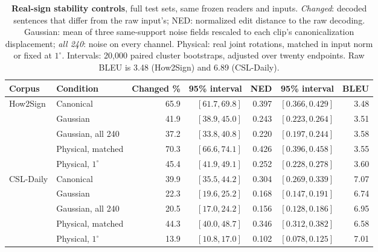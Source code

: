 \begin{table}[!htbp]
\centering\footnotesize
\caption{\textbf{Real-sign stability controls}, full test sets, same frozen readers and inputs. \emph{Changed}: decoded sentences that differ from the raw input's; NED: normalized edit distance to the raw decoding. Gaussian: mean of three same-support noise fields rescaled to each clip's canonicalization displacement; \emph{all 240}: noise on every channel. Physical: real joint rotations, matched in input norm or fixed at $1^\circ$. Intervals: 20,000 paired cluster bootstraps, adjusted over twenty endpoints. Raw BLEU is 3.48 (How2Sign) and 6.89 (CSL-Daily).}\label{tab:signstability}
\begin{tabular}{@{}llrrrrr@{}}\toprule
Corpus&Condition&Changed \%&95\% interval&NED&95\% interval&BLEU\\\midrule
How2Sign&Canonical&65.9&$[61.7,69.8]$&0.397&$[0.366,0.429]$&3.48\\
&Gaussian&41.9&$[38.9,45.0]$&0.243&$[0.223,0.264]$&3.51\\
&Gaussian, all 240&37.2&$[33.8,40.8]$&0.220&$[0.197,0.244]$&3.58\\
&Physical, matched&70.3&$[66.6,74.1]$&0.426&$[0.396,0.458]$&3.55\\
&Physical, $1^\circ$&45.4&$[41.9,49.1]$&0.252&$[0.228,0.278]$&3.60\\\midrule
CSL-Daily&Canonical&39.9&$[35.5,44.2]$&0.304&$[0.269,0.339]$&7.07\\
&Gaussian&22.3&$[19.6,25.2]$&0.168&$[0.147,0.191]$&6.74\\
&Gaussian, all 240&20.5&$[17.0,24.2]$&0.156&$[0.128,0.186]$&6.95\\
&Physical, matched&44.3&$[40.0,48.7]$&0.346&$[0.312,0.382]$&6.58\\
&Physical, $1^\circ$&13.9&$[10.8,17.0]$&0.102&$[0.078,0.125]$&7.01\\
\bottomrule\end{tabular}\end{table}
